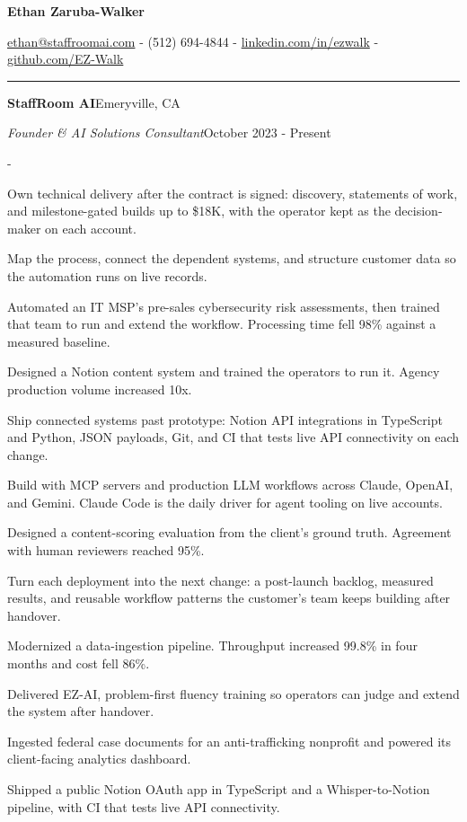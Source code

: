 \documentclass[10pt,letterpaper]{article}
\newenvironment{cvitems}{%
  \begin{list}{-}{%
    \setlength{\leftmargin}{12pt}%
    \setlength{\itemsep}{1.2pt}%
    \setlength{\parsep}{0pt}%
    \setlength{\topsep}{1.5pt}%
    \setlength{\partopsep}{0pt}%
    \setlength{\labelwidth}{6pt}%
    \setlength{\labelsep}{6pt}%
    \setlength{\itemindent}{0pt}%
  }%
}{\end{list}}
\newcommand{\cvsection}[1]{%
  \vspace{7pt}%
  \noindent{\bfseries\fontsize{11pt}{13pt}\selectfont\MakeUppercase{#1}}\par
  \vspace{1pt}%
  \noindent\rule{\textwidth}{0.4pt}\par
  \vspace{4pt}%
}
\newcommand{\cventryhead}[4]{%
  \noindent\textbf{#1}\hfill#2\par
  \vspace{0.5pt}%
  \noindent\textit{#3}\hfill#4\par
}
\begin{document}
\begin{center}
  {\bfseries\fontsize{22pt}{24pt}\selectfont Ethan Zaruba-Walker\par}
  \vspace{4pt}
  {\fontsize{10pt}{12pt}\selectfont
    \href{mailto:ethan@staffroomai.com}{ethan@staffroomai.com}
    {-}
    (512) 694-4844
    {-}
    \href{https://linkedin.com/in/ezwalk}{linkedin.com/in/ezwalk}
    {-}
    \href{https://github.com/EZ-Walk}{github.com/EZ-Walk}\par}
\end{center}
\vspace{2pt}

\cvsection{Experience}

\cventryhead{StaffRoom AI}{Emeryville, CA}
{Founder \& AI Solutions Consultant}{October 2023 - Present}
\begin{cvitems}
  \item Own technical delivery after the contract is signed: discovery, statements of work, and milestone-gated builds up to \$18K, with the operator kept as the decision-maker on each account.
  \item Map the process, connect the dependent systems, and structure customer data so the automation runs on live records.
  \item Automated an IT MSP's pre-sales cybersecurity risk assessments, then trained that team to run and extend the workflow. Processing time fell 98\% against a measured baseline.
  \item Designed a Notion content system and trained the operators to run it. Agency production volume increased 10x.
  \item Ship connected systems past prototype: Notion API integrations in TypeScript and Python, JSON payloads, Git, and CI that tests live API connectivity on each change.
  \item Build with MCP servers and production LLM workflows across Claude, OpenAI, and Gemini. Claude Code is the daily driver for agent tooling on live accounts.
  \item Designed a content-scoring evaluation from the client's ground truth. Agreement with human reviewers reached 95\%.
  \item Turn each deployment into the next change: a post-launch backlog, measured results, and reusable workflow patterns the customer's team keeps building after handover.
  \item Modernized a data-ingestion pipeline. Throughput increased 99.8\% in four months and cost fell 86\%.
  \item Delivered EZ-AI, problem-first fluency training so operators can judge and extend the system after handover.
  \item Ingested federal case documents for an anti-trafficking nonprofit and powered its client-facing analytics dashboard.
  \item Shipped a public Notion OAuth app in TypeScript and a Whisper-to-Notion pipeline, with CI that tests live API connectivity.
\end{cvitems}
\end{document}
